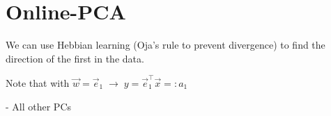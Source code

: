 
\section{Online-PCA}


\begin{frame}
We can use Hebbian learning (Oja's rule to prevent divergence) 
to find the direction of the first  in the data. \\

\pause

Note that with $\vec w = \vec e_1 \; \rightarrow \; y = \vec e_1^\top \vec x =: a_1$\\


\pause

- All other PCs

\end{frame}

